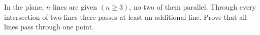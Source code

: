 In the plane, $n$ lines are given $(n \geq 3)$, no two of them parallel. Through every intersection of two lines there passes at least an additional line. Prove that all lines pass through one point.
